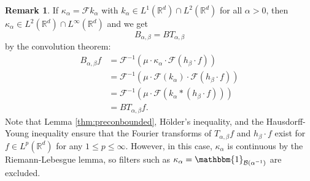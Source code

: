 \documentclass{article}
\theoremstyle{definition}
\newtheorem{remark}[theorem]{Remark}
\newcommand{\R}{\mathbb{R}}
\newcommand{\characteristic}[1]{\mathbbm{1}_{#1}}
\newcommand{\ball}{\mathcal{B}}
\newcommand{\ballorigin}[1]{\ball\left({#1}\right)}
\newcommand{\fourier}{\mathcal{F}}
\begin{document}
\begin{remark}
    If \(\kappa_\alpha = \fourier k_\alpha\) with \(k_\alpha\in L^1(\R^d)\cap L^2(\R^d)\) for all \(\alpha >0\),
    then \(\kappa_\alpha\in L^2(\R^d)\cap L^\infty(\R^d)\) and we get
    \begin{equation*}
    B_{\alpha,\beta} = BT_{\alpha,\beta}
    \end{equation*}
    by the convolution theorem:
    \begin{align*}
        B_{\alpha,\beta}f
        &=
        \fourier^{-1}\left(
        \mu\cdot 
        \kappa_\alpha
        \cdot 
        \fourier\left({h_\beta}\cdot f\right)
        \right)
        \\&
        =
        \fourier^{-1}\left(
        \mu\cdot 
        \fourier(k_\alpha)
        \cdot 
        \fourier\left({h_\beta}\cdot f\right)
        \right)
        \\&
        =
        \fourier^{-1}\left(
        \mu\cdot 
        \fourier\left(k_\alpha * ({h_\beta}\cdot f)\right)
        \right)
        \\&
        =
        BT_{\alpha,\beta}f.
    \end{align*}
    Note that Lemma \ref{thm:preconbounded}, H\"older's inequality, and the Hausdorff-Young inequality  ensure that the Fourier transforms of \(T_{\alpha,\beta}f\) and \(h_\beta\cdot f\) exist for \(f\in L^p(\R^d)\) for any \(1\leq p \leq \infty\).
    However, in this case, \(\kappa_\alpha\) is continuous by the Riemann-Lebesgue lemma,
    so filters such as
    \(\kappa_\alpha = \characteristic{\ballorigin{\alpha^{-1}}}\) are excluded.
\end{remark}
\end{document}
